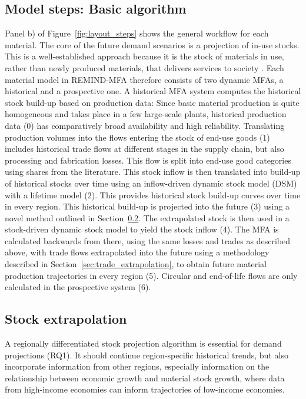 \documentclass[pdflatex]{sn-jnl}
\begin{document}
\subsection{Model steps: Basic algorithm}\label{sec:model_steps}
Panel b) of Figure~\ref{fig:layout_steps} shows the general workflow for each material. The core of the future demand scenarios is a projection of in-use stocks. This is a well-established approach because it is the stock of materials in use, rather than newly produced materials, that delivers services to society \parencite{b.mullerStockDynamicsForecasting2006}. Each material model in REMIND-MFA therefore consists of two dynamic MFAs, a historical and a prospective one. A historical MFA system computes the historical stock build-up based on production data: Since basic material production is quite homogeneous and takes place in a few large-scale plants, historical production data (0) has comparatively broad availability and high reliability. Translating production volumes into the flows entering the stock of end-use goods (1) includes historical trade flows at different stages in the supply chain, but also processing and fabrication losses. This flow is split into end-use good categories using shares from the literature. This stock inflow is then translated into build-up of historical stocks over time using an inflow-driven dynamic stock model (DSM) with a lifetime model (2). This provides historical stock build-up curves over time in every region. This historical build-up is projected into the future (3) using a novel method outlined in Section~\ref{sec:stock_extrapolation}. The extrapolated stock is then used in a stock-driven dynamic stock model to yield the stock inflow (4). The MFA is calculated backwards from there, using the same losses and trades as described above, with trade flows extrapolated into the future using a methodology described in Section~\ref{sec:trade_extrapolation}, to obtain future material production trajectories in every region (5). Circular and end-of-life flows are only calculated in the prospective system (6).

\subsection{Stock extrapolation}\label{sec:stock_extrapolation}
A regionally differentiated stock projection algorithm is essential for demand projections (RQ1). It should continue region-specific historical trends, but also incorporate information from other regions, especially information on the relationship between economic growth and material stock growth, where data from high-income economies can inform trajectories of low-income economies.
\end{document}
